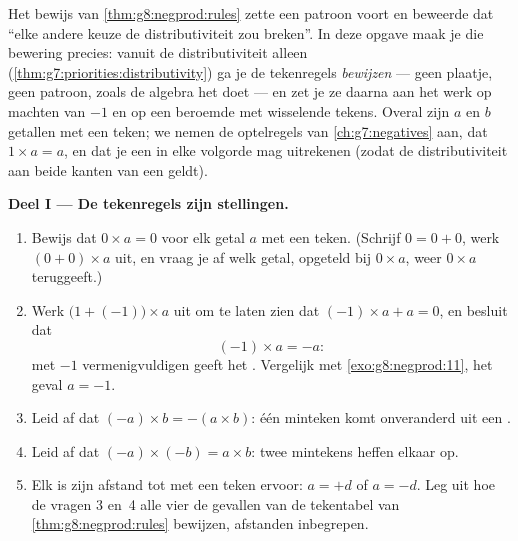 \begin{problem}
\label{pb:g8:negprod:1}
Het bewijs van \cref{thm:g8:negprod:rules} zette een patroon voort en beweerde dat
``elke andere keuze de distributiviteit zou breken''. In deze opgave maak je die
bewering precies: vanuit de distributiviteit alleen
(\cref{thm:g7:priorities:distributivity}) ga je de tekenregels \emph{bewijzen} ---
geen plaatje, geen patroon, zoals de algebra het doet --- en zet je ze daarna aan het
werk op machten van $-1$ en op een beroemde  met wisselende tekens. Overal zijn $a$
en $b$ getallen met een teken; we nemen de optelregels van \cref{ch:g7:negatives} aan,
dat $1 \times a = a$, en dat je een  in elke volgorde mag uitrekenen (zodat de
distributiviteit aan beide kanten van een  geldt).

\medskip
\noindent\textbf{Deel I --- De tekenregels zijn stellingen.}
\begin{enumerate}
  \item Bewijs dat $0 \times a = 0$ voor elk getal $a$ met een teken. (Schrijf
        $0 = 0 + 0$, werk $(0 + 0) \times a$ uit, en vraag je af welk getal, opgeteld
        bij $0 \times a$, weer $0 \times a$ teruggeeft.)
  \item Werk $\bigl(1 + (-1)\bigr) \times a$ uit om te laten zien dat
        $(-1) \times a + a = 0$, en besluit dat
        \[
        (-1) \times a = -a :
        \]
        met $-1$ vermenigvuldigen geeft het . Vergelijk met
        \cref{exo:g8:negprod:11}, het geval $a = -1$.
  \item Leid af dat $(-a) \times b = -(a \times b)$: één minteken komt onveranderd uit
        een .
  \item Leid af dat $(-a) \times (-b) = a \times b$: twee mintekens heffen elkaar op.
  \item Elk  is zijn afstand tot  met een teken ervoor:
        $a = +d$ of $a = -d$. Leg uit hoe de vragen 3 en~4 alle vier de gevallen van de
        tekentabel van \cref{thm:g8:negprod:rules} bewijzen, afstanden inbegrepen.
\end{enumerate}


\end{problem}
